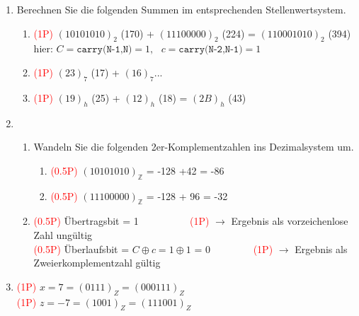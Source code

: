 \begin{enumerate}
	\item Berechnen Sie die folgenden Summen im entsprechenden Stellenwertsystem.
	\begin{enumerate}
		\item \textcolor{red}{(1P)} $(10101010)_2$ (170) + $(11100000)_2$ (224) = $(110001010)_2$  (394)\\
		hier: $C=\texttt{carry(N-1,N)}=1,~~~ c=\texttt{carry(N-2,N-1)}=1$
		\item \textcolor{red}{(1P)}  $(23)_7$ (17) + $(16)_7$...
		\item \textcolor{red}{(1P)} $(19)_{h}$  (25) + $(12)_{h}$ (18) = $(2B)_{h}$ (43)
	\end{enumerate}
	\item 
	\begin{enumerate}
		\item Wandeln Sie die folgenden 2er-Komplementzahlen ins Dezimalsystem um.
		\begin{enumerate}
			\item \textcolor{red}{(0.5P)} $(10101010)_{\mathbb{Z}}$ = -128 +42 = -86
			\item \textcolor{red}{(0.5P)} $(11100000)_{\mathbb{Z}}$ = -128 + 96 = -32
		\end{enumerate}
		\item \textcolor{red}{(0.5P)} Übertragsbit = 1  ~~~~~~~~~ \textcolor{red}{(1P)} $\rightarrow$ Ergebnis als vorzeichenlose Zahl ungültig \\
		\textcolor{red}{(0.5P)} Überlaufsbit = $C \oplus c = 1 \oplus 1$ = 0~~~~~~~~ \textcolor{red}{(1P)} $\rightarrow$ Ergebnis als Zweierkomplementzahl gültig 
	\end{enumerate}
	\item \textcolor{red}{(1P)} $x = 7 = (0111)_Z = (000111)_Z$\\
	\textcolor{red}{(1P)} $z = -7 = (1001)_Z = (111001)_Z$
\end{enumerate}
